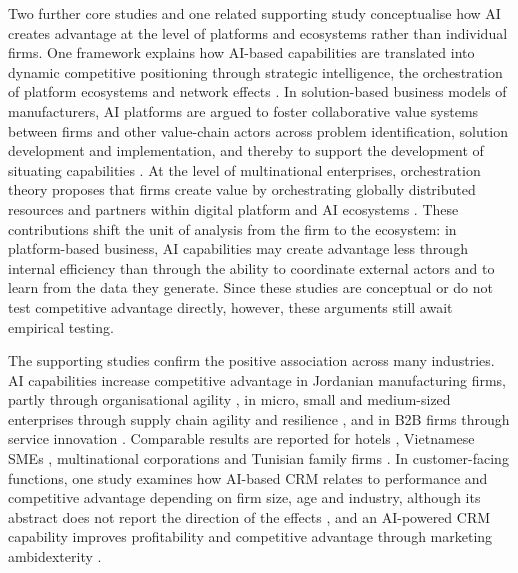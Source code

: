 Two further core studies and one related supporting study conceptualise how AI creates advantage at the level of platforms and ecosystems rather than individual firms. One framework explains how AI-based capabilities are translated into dynamic competitive positioning through strategic intelligence, the orchestration of platform ecosystems and network effects . In solution-based business models of manufacturers, AI platforms are argued to foster collaborative value systems between firms and other value-chain actors across problem identification, solution development and implementation, and thereby to support the development of situating capabilities . At the level of multinational enterprises, orchestration theory proposes that firms create value by orchestrating globally distributed resources and partners within digital platform and AI ecosystems . These contributions shift the unit of analysis from the firm to the ecosystem: in platform-based business, AI capabilities may create advantage less through internal efficiency than through the ability to coordinate external actors and to learn from the data they generate. Since these studies are conceptual or do not test competitive advantage directly, however, these arguments still await empirical testing.

The supporting studies confirm the positive association across many industries. AI capabilities increase competitive advantage in Jordanian manufacturing firms, partly through organisational agility , in micro, small and medium-sized enterprises through supply chain agility and resilience , and in B2B firms through service innovation . Comparable results are reported for hotels , Vietnamese SMEs , multinational corporations  and Tunisian family firms . In customer-facing functions, one study examines how AI-based CRM relates to performance and competitive advantage depending on firm size, age and industry, although its abstract does not report the direction of the effects , and an AI-powered CRM capability improves profitability and competitive advantage through marketing ambidexterity .

